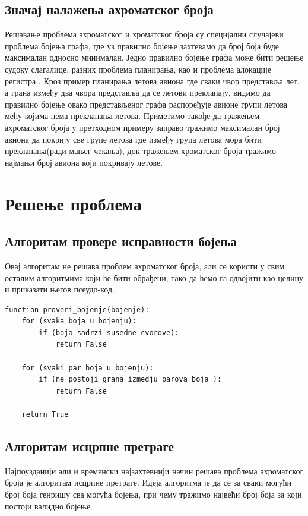 \documentclass[a4paper]{article}
\begin{document}
{	\subsection{Значај налажења ахроматског броја}
	Решавање проблема ахроматског и хроматског броја су специјални случајеви проблема бојења графа, где уз правилно бојење захтевамо да број боја буде максималан односно минималан. Једно правилно бојење графа може бити решење судоку слагалице, разних проблема планирања, као и проблема алокације регистра \cite{coloringapplications}. Кроз пример планирања летова авиона где сваки чвор представља лет, а грана између два чвора представља да се летови преклапају, видимо да правилно бојење овако представљеног графа распоређује авионе групи летова мећу којима нема преклапања летова. Приметимо такође да тражењем ахроматског броја у претходном примеру заправо тражимо максималан број авиона да покрију све групе летова где између група летова мора бити преклапања(ради мањег чекања), док тражењем хроматског броја тражимо најмањи број авиона који покривају летове.  



\section{Решење проблема}
\label{sec:problem-solution}

\subsection{Алгоритам провере исправности бојења}
Овај алгоритам не решава проблем ахроматског броја, али се користи у свим осталим алгоритмима који ће бити обрађени, тако да ћемо га одвојити као целину и приказати његов псеудо-код. 

\begin{lstlisting}[caption={Псеудо-код провере исправности бојења},frame=single]
function proveri_bojenje(bojenje):
	for (svaka boja u bojenju):
		if (boja sadrzi susedne cvorove):
			return False
	
	for (svaki par boja u bojenju):
		if (ne postoji grana izmedju parova boja ):
			return False
			
	return True
\end{lstlisting}
 
\subsection{Алгоритам исцрпне претраге}
Најпоузданији али и временски најзахтевнији начин решава проблема ахроматског броја је алгоритам исцрпне претраге. Идеја алгоритма је да се за сваки могући број боја генришу сва могућа бојења, при чему тражимо највећи број боја за који постоји валидно бојење.  

}
\end{document}
